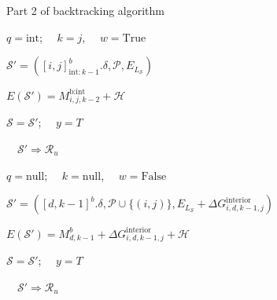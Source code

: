 \begin{algorithm}
	\caption*{Part 2 of backtracking algorithm}
	\begin{algorithmic}[1]
		\footnotesize
		
		 
		
		\State $q = \text{int}$; \ \ $k = j$, \ \ $w= \mathrm{True}$
		\EndIf	
		
		
		\State$\mathcal{S}' = ([i,j]^b_{\text{int}:k-1}.\delta, \mathcal{P}, E_{L_{\mathcal{S}}})$ 
		
		\State $E(\mathcal{S}')  = M_{i,j,k-2}^\text{b:int} + \mathcal{H}$
		
		
		
		\State $\mathcal{S} = \mathcal{S}'$; \ \  $y = T$
		
		\Else \ \  $\mathcal{S}' \Rightarrow \mathcal{R}_u$		
		
		\EndIf
		\EndIf
		\EndIf	
		
		
		\State $q = \text{null}$; \ \ $k = \text{null}$, \ \ $w= \mathrm{False}$ 
		\EndIf	
		
		
		
		
		
		\State  $\mathcal{S}' = ([d,k-1]^b.\delta, \mathcal{P} \cup \{(i,j)\}, E_{L_{\mathcal{S}}} + \Delta G_{i,d,k-1,j}^\text{interior})$
		
		\State $E(\mathcal{S}')  = M^b_{d,k-1} + \Delta G_{i,d,k-1,j}^\text{interior} + \mathcal{H}$
		
		
		
		
		\State $\mathcal{S} = \mathcal{S}'$; \ \  $y = T$
		
		\Else  \ \  $\mathcal{S}' \Rightarrow \mathcal{R}_u$		
		
		
		\EndIf
		
		
		
		\EndIf
		\EndFor
		\EndIf
		

\end{algorithmic}
\end{algorithm}

